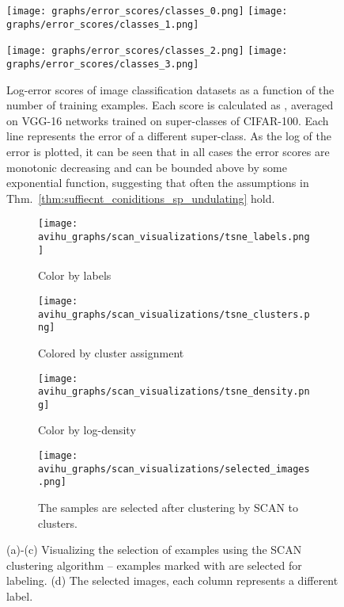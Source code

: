 \documentclass{article}
\begin{document}
\begin{figure}[thb!]
\texttt{[image: graphs/error\_scores/classes\_0.png]}
\texttt{[image: graphs/error\_scores/classes\_1.png]}

\texttt{[image: graphs/error\_scores/classes\_2.png]}
\texttt{[image: graphs/error\_scores/classes\_3.png]}
\caption{Log-error scores of image classification datasets as a function of the number of training examples. Each score is calculated as , averaged on  VGG-16 networks trained on super-classes of CIFAR-100. Each line represents the error of a different super-class. As the log of the error is plotted, it can be seen that in all cases the error scores are monotonic decreasing and can be bounded above by some exponential function, suggesting that often the assumptions in Thm.~\ref{thm:suffiecnt_coniditions_sp_undulating}  hold.}
\label{fig:error_scores_neural_networks}
\end{figure}

\begin{figure*}[thb!]
\begin{center}
    \begin{subfigure}{.27\textwidth}
      \centering
      \texttt{[image: avihu\_graphs/scan\_visualizations/tsne\_labels.png]}
      \caption{Color by labels}
      \label{subfig:tsne_labels}
    \end{subfigure}
    \begin{subfigure}{.27\textwidth}
      \centering
      \texttt{[image: avihu\_graphs/scan\_visualizations/tsne\_clusters.png]}
      \caption{Colored by cluster assignment}
      \label{subfig:tsne_clusters}
    \end{subfigure}
    \begin{subfigure}{.27\textwidth}
      \centering
      \texttt{[image: avihu\_graphs/scan\_visualizations/tsne\_density.png]}
      \caption{Color by log-density}
      \label{subfig:tsne_density}
    \end{subfigure}
    \begin{center}
    \begin{subfigure}{.55\textwidth}
      \centering
      \texttt{[image: avihu\_graphs/scan\_visualizations/selected\_images.png]}
      \caption{The  samples are selected after clustering by SCAN to  clusters.}
      \label{subfig:30_images_scan}
    \end{subfigure}
    \end{center}
    \caption{(a)-(c) Visualizing the selection of  examples using the SCAN clustering algorithm -- examples marked with  are selected for labeling. (d) The selected images, each column represents a different label.}
    \label{fig:tsne}
\end{center}
\vspace{-0.6cm}
\end{figure*}
\end{document}
